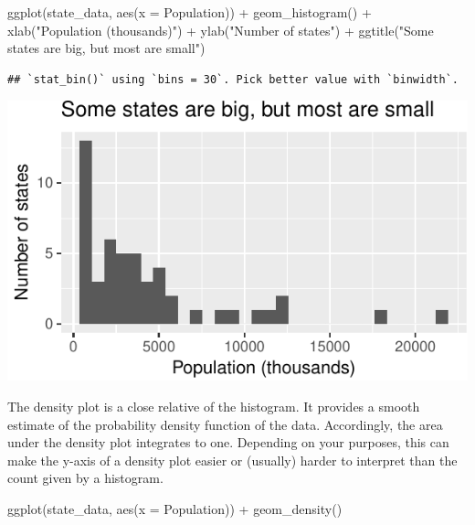 \documentclass[
  12pt,
  oneside,openany]{book}
\newenvironment{Shaded}{\begin{snugshade}}{\end{snugshade}}
\newcommand{\AttributeTok}[1]{\textcolor[rgb]{0.77,0.63,0.00}{#1}}
\newcommand{\FunctionTok}[1]{\textcolor[rgb]{0.00,0.00,0.00}{#1}}
\newcommand{\NormalTok}[1]{#1}
\newcommand{\SpecialCharTok}[1]{\textcolor[rgb]{0.00,0.00,0.00}{#1}}
\newcommand{\StringTok}[1]{\textcolor[rgb]{0.31,0.60,0.02}{#1}}
\begin{document}
\begin{Shaded}
\begin{Highlighting}[]
\FunctionTok{ggplot}\NormalTok{(state\_data, }\FunctionTok{aes}\NormalTok{(}\AttributeTok{x =}\NormalTok{ Population)) }\SpecialCharTok{+}
  \FunctionTok{geom\_histogram}\NormalTok{() }\SpecialCharTok{+}
  \FunctionTok{xlab}\NormalTok{(}\StringTok{"Population (thousands)"}\NormalTok{) }\SpecialCharTok{+}
  \FunctionTok{ylab}\NormalTok{(}\StringTok{"Number of states"}\NormalTok{) }\SpecialCharTok{+}
  \FunctionTok{ggtitle}\NormalTok{(}\StringTok{"Some states are big, but most are small"}\NormalTok{)}
\end{Highlighting}
\end{Shaded}

\begin{verbatim}
## `stat_bin()` using `bins = 30`. Pick better value with `binwidth`.
\end{verbatim}

\includegraphics{pdaps_files/figure-latex/axis-labeling-1.pdf}

The density plot is a close relative of the histogram. It provides a smooth estimate of the probability density function of the data. Accordingly, the area under the density plot integrates to one. Depending on your purposes, this can make the y-axis of a density plot easier or (usually) harder to interpret than the count given by a histogram.

\begin{Shaded}
\begin{Highlighting}[]
\FunctionTok{ggplot}\NormalTok{(state\_data, }\FunctionTok{aes}\NormalTok{(}\AttributeTok{x =}\NormalTok{ Population)) }\SpecialCharTok{+}
  \FunctionTok{geom\_density}\NormalTok{()}
\end{Highlighting}
\end{Shaded}
\end{document}
